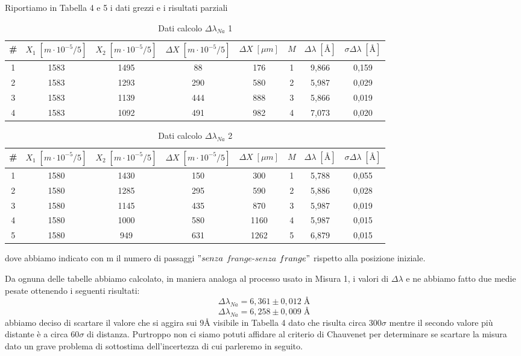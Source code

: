 \documentclass{article}
\begin{document}
\clearpage

Riportiamo in Tabella 4 e 5 i dati grezzi e i risultati parziali

\begin{table}[h!]
\centering
\begin{tabular}{ | c | c | c | c | c | c | c | c |}
\hline
 \# & $X_1 \; [m \cdot 10^{-5}/5]$ & $X_2 \; [m \cdot 10^{-5}/5]$ & $\Delta X \; [m \cdot 10^{-5}/5]$ & $\Delta X \; [\mu m]$ & $M$ & $\Delta\lambda \; [\textrm{Å}]$ & $\sigma\Delta\lambda \; [\textrm{Å}]$\\
\hline
   1 & 1583 & 1495 & 88 & 176 & 1 & 9,866 & 0,159\\
   2 & 1583 & 1293 & 290 & 580 & 2 & 5,987 & 0,029\\
   3 & 1583 & 1139 & 444 & 888 & 3 & 5,866 & 0,019\\
   4 & 1583 & 1092 & 491 & 982 & 4 & 7,073 & 0,020\\
\hline
\end{tabular}
\caption{Dati calcolo $\Delta\lambda_{Na}$ 1}
\label{table:4}
\end{table}


\begin{table}[h!]
\centering
\begin{tabular}{ | c | c | c | c | c | c | c | c |}
\hline
\# & $X_1 \; [m \cdot 10^{-5}/5]$ & $X_2 \; [m \cdot 10^{-5}/5]$ & $\Delta X \; [m \cdot 10^{-5}/5]$ & $\Delta X \; [\mu m]$ & $M$ & $\Delta\lambda \; [\textrm{Å}]$ & $\sigma\Delta\lambda \; [\textrm{Å}]$\\
\hline
   1 & 1580 & 1430 & 150 & 300 & 1 & 5,788 & 0,055\\
   2 & 1580 & 1285 & 295 & 590 & 2 & 5,886 & 0,028\\
   3 & 1580 & 1145 & 435 & 870 & 3 & 5,987 & 0,019\\
   4 & 1580 & 1000 & 580 & 1160 & 4 & 5,987 & 0,015\\
   5 & 1580 & 949 & 631 & 1262 & 5 & 6,879 & 0,015\\
\hline
\end{tabular}
\caption{Dati calcolo $\Delta\lambda_{Na}$ 2}
\label{table:5}
\end{table}

dove abbiamo indicato con m il numero di passaggi $"senza$ $frange$-$senza$ $frange"$ rispetto alla posizione iniziale.

Da ognuna delle tabelle abbiamo calcolato, in maniera analoga al processo usato in Misura 1, i valori di $\Delta\lambda$ e ne abbiamo fatto due medie pesate ottenendo i seguenti risultati:
\[ \Delta \lambda_{Na} = 6,361 \pm 0,012 \; \textrm{Å} \]
\[ \Delta \lambda_{Na} = 6,258 \pm 0,009 \; \textrm{Å} \]
abbiamo deciso di scartare il valore che si aggira sui $9 \textrm{Å}$ visibile in Tabella 4 dato che risulta circa 300$\sigma$ mentre il secondo valore più distante è a circa 60$\sigma$ di distanza. Purtroppo non ci siamo potuti affidare al criterio di Chauvenet per determinare se scartare la misura dato un grave problema di sottostima dell'incertezza di cui parleremo in seguito.
\end{document}
